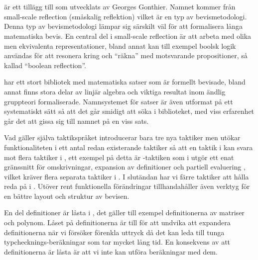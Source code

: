 \section{\ssr{}}
\ssr{} är ett tillägg till \coq som utvecklats av Georges Gonthier. Namnet
kommer från small-scale reflection (småskalig reflektion) vilket är en typ av
bevismetodologi. Denna typ av bevismetodologi lämpar sig särskilt väl för att
formalisera långa matematiska bevis. En central del i small-scale reflection är
att arbeta med olika men ekvivalenta representationer, bland annat kan till
exempel boolsk logik användas för att resonera kring och ``räkna'' med
motsvarande propositioner, så kallad ``boolean reflection''.

\ssr{} har ett stort bibliotek med matematiska satser som är formellt bevisade,
bland annat finns stora delar av linjär algebra och viktiga resultat inom
ändlig gruppteori formaliserade. Namnsystemet för satser är även utformat på
ett systematiskt sätt så att det går smidigt att söka i biblioteket, med viss
erfarenhet går det att gissa sig till namnet på en viss sats.

Vad gäller själva taktikspråket introducerar \ssr{} bara tre nya taktiker men
utökar funktionaliteten i ett antal redan existerande taktiker så att en taktik
i \ssr{} kan svara mot flera taktiker i \coq, ett exempel på detta är
-taktiken som i \ssr{} utgör ett enat gränssnitt för omskrivningar,
expansion av definitioner och partiell evaluering \cite{gonthier2008small},
vilket kräver flera separata taktiker i \coq. I slutändan har vi färre taktiker
att hålla reda på i \ssr{}. Utöver rent funktionella förändringar
tillhandahåller \ssr{} även verktyg för en bättre layout och struktur av
bevisen.

En del definitioner är låsta i \ssr{}, det gäller till exempel definitionerna
av matriser och polynom. Låset på definitionerna är till för att undvika att
expandera definitionerna när vi försöker förenkla uttryck då det kan leda till
tunga typchecknings-beräkningar som tar mycket lång tid. En konsekvens av att
definitionerna är låsta är att vi inte kan utföra beräkningar med dem.
